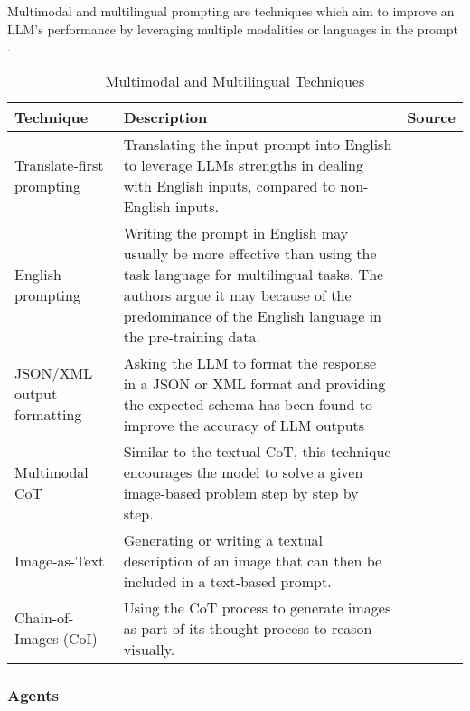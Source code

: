 Multimodal and multilingual prompting are techniques which aim to improve an LLM's performance by leveraging multiple modalities or languages in the prompt \parencite{prompt1}.

\begin{table}[h!]
    \centering
    \begin{tabular}{p{3cm} p{8cm} p{2cm}}
        \toprule
        \textbf{Technique} & \textbf{Description} & \textbf{Source} \\
        \midrule
        \raggedright
        Translate-first prompting & Translating the input prompt into English to leverage LLMs strengths in dealing with English inputs, compared to non-English inputs. & \textcite{translate-first} \\
        \hline
        \raggedright
        English prompting & Writing the prompt in English may usually be more effective than using the task language for multilingual tasks. The authors argue it may because of the predominance of the English language in the pre-training data. & \textcite{english-prompting} \\
        \hline
        \raggedright
        JSON/XML output formatting & Asking the LLM to format the response in a JSON or XML format and providing the expected schema has been found to improve the accuracy of LLM outputs  & \textcite{jsonllm} \\
        \hline
        \raggedright
        Multimodal CoT & Similar to the textual CoT, this technique encourages the model to solve a given image-based problem step by step by step. & \textcite{multimodal-cot} \\
        \hline
        \raggedright
        Image-as-Text & Generating or writing a textual description of an image that can then be included in a text-based prompt. & \textcite{images-as-text} \\
        \hline
        \raggedright
        Chain-of-Images (CoI) & Using the CoT process to generate images as part of its thought process to reason visually. & \textcite{coi} \\
        \bottomrule
    \end{tabular}
    \caption{Multimodal and Multilingual Techniques}
    \label{tab:multi_prompt}
\end{table}

\FloatBarrier

\subsubsection{Agents}

